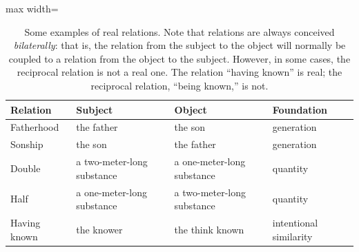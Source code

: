 \documentclass[
  12pt,
]{memoir}
\begin{document}
\begin{table}[ht]
\begin{center}
\caption{Some examples of real relations. Note that relations are always conceived \emph{bilaterally}: that is, the relation from the subject to the object will normally be coupled to a relation from the object to the subject. However, in some cases, the reciprocal relation is not a real one. The relation “having known” is real; the reciprocal relation, “being known,” is not.}
\label{tab:examples-of-real-relations}
{
\disablehyphenation
\begin{adjustbox}{max width=\textwidth}
\begin{tabular}{l|l|l|l}
\toprule
Relation & Subject & Object & Foundation \\
\midrule
Fatherhood & the father & the son & generation \\
Sonship & the son & the father & generation \\
Double & a two-meter-long substance & a one-meter-long substance & quantity \\
Half & a one-meter-long substance & a two-meter-long substance & quantity \\
Having known & the knower & the think known & intentional similarity \\
\bottomrule
\end{tabular}
\end{adjustbox}
}
\end{center}
\end{table}
\end{document}
